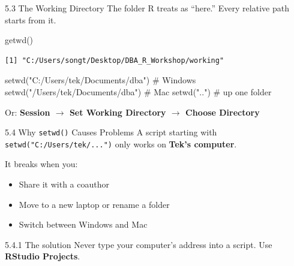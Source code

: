 \documentclass[
  ignorenonframetext,
  aspectratio=169,
]{beamer}
\newenvironment{Shaded}{\begin{snugshade}}{\end{snugshade}}
\newcommand{\CommentTok}[1]{\textcolor[rgb]{0.37,0.37,0.37}{#1}}
\newcommand{\FunctionTok}[1]{\textcolor[rgb]{0.28,0.35,0.67}{#1}}
\newcommand{\NormalTok}[1]{\textcolor[rgb]{0.00,0.23,0.31}{#1}}
\newcommand{\StringTok}[1]{\textcolor[rgb]{0.13,0.47,0.30}{#1}}
\providecommand{\tightlist}{%
  \setlength{\itemsep}{0pt}\setlength{\parskip}{0pt}}
\begin{document}
\begin{frame}[fragile]{5.3 The Working Directory}
\protect{}\label{the-working-directory}
The folder R treats as ``here.'' Every relative path starts from it.

\begin{Shaded}
\begin{Highlighting}[]
\FunctionTok{getwd}\NormalTok{()}
\end{Highlighting}
\end{Shaded}

\begingroup\tiny\color{darkgray}

\begin{verbatim}
[1] "C:/Users/songt/Desktop/DBA_R_Workshop/working"
\end{verbatim}

\endgroup

\begin{Shaded}
\begin{Highlighting}[]
\FunctionTok{setwd}\NormalTok{(}\StringTok{"C:/Users/tek/Documents/dba"}\NormalTok{)   }\CommentTok{\# Windows}
\FunctionTok{setwd}\NormalTok{(}\StringTok{"/Users/tek/Documents/dba"}\NormalTok{)     }\CommentTok{\# Mac}
\FunctionTok{setwd}\NormalTok{(}\StringTok{".."}\NormalTok{)                           }\CommentTok{\# up one folder}
\end{Highlighting}
\end{Shaded}

Or: \textbf{Session \(\rightarrow\) Set Working Directory
\(\rightarrow\) Choose Directory}
\end{frame}

\begin{frame}[fragile]{5.4 Why \texttt{setwd()} Causes Problems}
\protect{}\label{why-setwd-causes-problems}
A script starting with \texttt{setwd("C:/Users/tek/...")} only works on
\textbf{Tek's computer}.

It breaks when you:

\begin{itemize}
\tightlist
\item
  Share it with a coauthor
\item
  Move to a new laptop or rename a folder
\item
  Switch between Windows and Mac
\end{itemize}

\begin{exampleblock}{5.4.1 The solution}
\protect{}\label{the-solution}
Never type your computer's address into a script. Use \textbf{RStudio
Projects}.
\end{exampleblock}
\end{frame}
\end{document}

